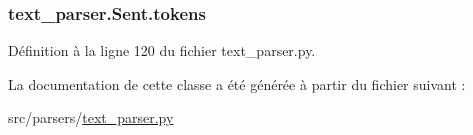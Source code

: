 \subsubsection[{tokens}]{\setlength{\rightskip}{0pt plus 5cm}text\+\_\+parser.\+Sent.\+tokens}\label{classtext__parser_1_1_sent_ac8e5a72834e623d4b0e84bdd1d0a431a}


Définition à la ligne 120 du fichier text\+\_\+parser.\+py.



La documentation de cette classe a été générée à partir du fichier suivant \+:\begin{DoxyCompactItemize}
\item 
src/parsers/\hyperlink{text__parser_8py}{text\+\_\+parser.\+py}\end{DoxyCompactItemize}
